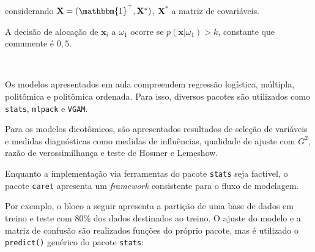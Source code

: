 \documentclass[
  a4paperpaper,
]{article}
\newenvironment{Shaded}{\begin{snugshade}}{\end{snugshade}}
\newcommand{\AttributeTok}[1]{\textcolor[rgb]{0.40,0.45,0.13}{#1}}
\newcommand{\ConstantTok}[1]{\textcolor[rgb]{0.56,0.35,0.01}{#1}}
\newcommand{\DecValTok}[1]{\textcolor[rgb]{0.68,0.00,0.00}{#1}}
\newcommand{\FunctionTok}[1]{\textcolor[rgb]{0.28,0.35,0.67}{#1}}
\newcommand{\NormalTok}[1]{\textcolor[rgb]{0.00,0.23,0.31}{#1}}
\newcommand{\OtherTok}[1]{\textcolor[rgb]{0.00,0.23,0.31}{#1}}
\newcommand{\SpecialCharTok}[1]{\textcolor[rgb]{0.37,0.37,0.37}{#1}}
\newcommand{\StringTok}[1]{\textcolor[rgb]{0.13,0.47,0.30}{#1}}
\begin{document}
\noindent considerando
\(\mathbf{X} = (\mathbbm{1}^\top, \mathbf{X}^*)\), \(\mathbf{X}^*\) a
matriz de covariáveis.

A decisão de alocação de \(\mathbf{x}_i\) a \(\omega_1\) ocorre se
\(p(\mathbf{x}|\omega_1)> k\), constante que comumente é \(0,5\).

~

Os modelos apresentados em aula compreendem regressão logística,
múltipla, politômica e politômica ordenada. Para isso, diversos pacotes
são utilizados como \texttt{stats}, \texttt{mlpack} e \texttt{VGAM}.

Para os modelos dicotômicos, são apresentados resultados de seleção de
variáveis e medidas diagnósticas como medidas de influências, qualidade
de ajuste com \(G^2\), razão de verossimilhança e teste de Hosmer e
Lemeshow.

Enquanto a implementação via ferramentas do pacote \texttt{stats} seja
factível, o pacote \texttt{caret} apresenta um \emph{framework}
consistente para o fluxo de modelagem.

Por exemplo, o bloco a seguir apresenta a partição de uma base de dados
em treino e teste com 80\% dos dados destinados ao treino. O ajuste do
modelo e a matriz de confusão são realizados funções do próprio pacote,
mas é utilizado o \texttt{predict()} genérico do pacote \texttt{stats}:

~

\begin{Shaded}
\end{Shaded}
\end{document}
